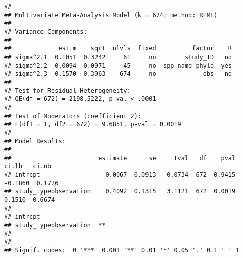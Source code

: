 \documentclass[]{article}
\newenvironment{Shaded}{\begin{snugshade}}{\end{snugshade}}
\newcommand{\KeywordTok}[1]{\textcolor[rgb]{0.13,0.29,0.53}{\textbf{#1}}}
\newcommand{\DataTypeTok}[1]{\textcolor[rgb]{0.13,0.29,0.53}{#1}}
\newcommand{\DecValTok}[1]{\textcolor[rgb]{0.00,0.00,0.81}{#1}}
\newcommand{\StringTok}[1]{\textcolor[rgb]{0.31,0.60,0.02}{#1}}
\newcommand{\CommentTok}[1]{\textcolor[rgb]{0.56,0.35,0.01}{\textit{#1}}}
\newcommand{\OperatorTok}[1]{\textcolor[rgb]{0.81,0.36,0.00}{\textbf{#1}}}
\newcommand{\NormalTok}[1]{#1}
\begin{document}
\begin{Shaded}
\end{Shaded}

\begin{verbatim}
## 
## Multivariate Meta-Analysis Model (k = 674; method: REML)
## 
## Variance Components:
## 
##             estim    sqrt  nlvls  fixed          factor    R 
## sigma^2.1  0.1051  0.3242     61     no        study_ID   no 
## sigma^2.2  0.0094  0.0971     45     no  spp_name_phylo  yes 
## sigma^2.3  0.1570  0.3963    674     no             obs   no 
## 
## Test for Residual Heterogeneity:
## QE(df = 672) = 2198.5222, p-val < .0001
## 
## Test of Moderators (coefficient 2):
## F(df1 = 1, df2 = 672) = 9.6851, p-val = 0.0019
## 
## Model Results:
## 
##                        estimate      se     tval   df    pval    ci.lb   ci.ub 
## intrcpt                 -0.0067  0.0913  -0.0734  672  0.9415  -0.1860  0.1726 
## study_typeobservation    0.4092  0.1315   3.1121  672  0.0019   0.1510  0.6674 
##  
## intrcpt 
## study_typeobservation  ** 
## 
## ---
## Signif. codes:  0 '***' 0.001 '**' 0.01 '*' 0.05 '.' 0.1 ' ' 1
\end{verbatim}
\end{document}
